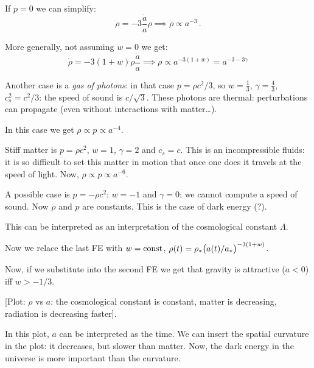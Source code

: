 \documentclass[main.tex]{subfiles}
\begin{document}


If \(p=0\) we can simplify:
\begin{equation}
  \dot{\rho} = -3 \frac{\dot{a} }{a} \rho \implies 
  \rho \propto a^{-3}\,.
\end{equation}

More generally, not assuming \(w=0\) we get:
\begin{equation}
  \dot{\rho} = -3 (1+w) \rho \frac{\dot{a} }{a} \implies \rho \propto a^{-3 (1+w)} = a^{-3 -3\gamma}
\end{equation}

Another case is a \emph{gas of photons}: in that case \(p = \rho c^2 / 3\), so \(w=\frac{1}{3} \), \(\gamma = \frac{4}{3} \), \(c_{s}^2 = c^2 / 3 \): the speed of sound is \(c / \sqrt{3} \). These photons are thermal: perturbations can propagate (even without interactions with matter\dots). 

In this case we get \(\rho \propto p \propto a^{-4}\).

Stiff matter is \(p = \rho c^2\), \(w=1\), \(\gamma=2\) and \(c_s = c\). This is an incompressible fluids: it is so difficult to set this matter in motion that once one does it travels at the speed of light. Now, \(\rho \propto p \propto a^{-6}\).

A possible case is \(p = - \rho c^2\): \(w = -1\) and \(\gamma = 0\): we cannot compute a speed of sound. Now \(\rho\) and \(p\) are constants. This is the case of dark energy (?).

This can be interpreted as an interpretation of the cosmological constant \(\Lambda\).

Now we relace the last FE with \(w = \text{const}\), \(\rho(t) = \rho_{*} \qty(a(t) / a_{*})^{-3(1+w)}  \).

Now, if we substitute into the second FE we get that gravity is attractive (\(\ddot{a} < 0 \)) iff \(w > -1/3\). 

[Plot: \(\rho\) vs \(a\): the cosmological constant is constant, matter is decreasing, radiation is decreasing faster].

In this plot, \(a\) can be interpreted as the time.
We can insert the spatial curvature in the plot: it decreases, but slower than matter. 
Now, the dark energy in the universe is more important than the curvature. 
\end{document}
